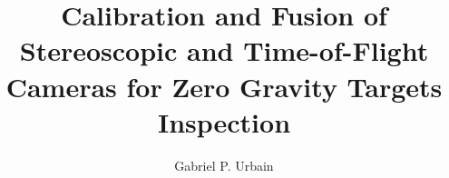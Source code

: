 % 
% 
%
%
%
%
%
%
%
% 
% 

\title{Calibration and Fusion of Stereoscopic and Time-of-Flight Cameras for Zero Gravity Targets Inspection}

\author{Gabriel P. Urbain}



